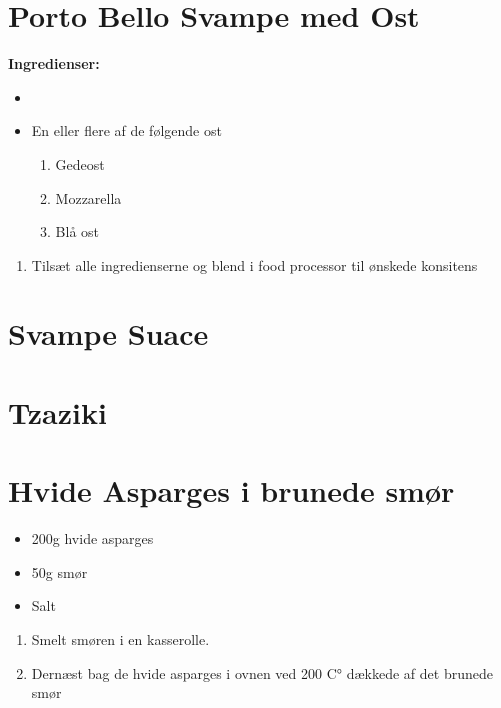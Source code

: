 \documentclass{book}
\begin{document}
{\section{Porto Bello Svampe med Ost}
\begin{minipage}[t]{0.5\textwidth}
\textbf{Ingredienser:}
\begin{itemize}
    \item 
    \item En eller flere af de følgende ost
    \begin{enumerate}
        \item Gedeost
        \item Mozzarella  
        \item Blå ost
    \end{enumerate}
\end{itemize}
\end{minipage}
\begin{minipage}[t]{0.5\textwidth}
\begin{enumerate}
    \item Tilsæt alle ingredienserne og blend i food processor til ønskede konsitens
\end{enumerate}
\end{minipage}


\section{Svampe Suace}

\begin{minipage}[t]{0.5\textwidth}
\end{minipage}
\begin{minipage}[t]{0.5\textwidth}
\end{minipage}
\section{Tzaziki}
\begin{minipage}[t]{0.5\textwidth}
\end{minipage}
\begin{minipage}[t]{0.5\textwidth}
\end{minipage}
\section{Hvide Asparges i brunede smør}
\begin{minipage}[t]{0.5\textwidth}
\begin{itemize}
    \item 200g hvide asparges 
    \item 50g smør
    \item Salt
\end{itemize}
\end{minipage}
\begin{minipage}[t]{0.5\textwidth}
\begin{enumerate}
    \item Smelt smøren i en kasserolle.
    \item Dernæst bag de hvide asparges i ovnen ved 200 C° dækkede af det brunede smør
\end{enumerate}
\end{minipage}

}
\end{document}
